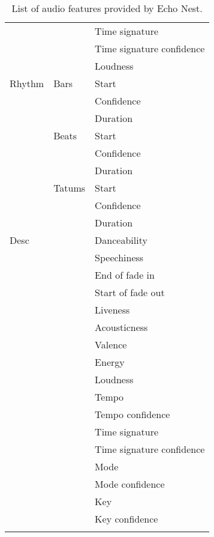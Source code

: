 \begin{center}
\begin{longtable}{ p{} p{} p{} }
& & Time signature \\ \cmidrule(r){3-3}
& & Time signature confidence \\ \cmidrule(r){3-3}
& & Loudness \\ \hline
Rhythm & Bars & Start \\ \cmidrule(r){3-3}
& & Confidence \\ \cmidrule(r){3-3}
& & Duration \\ \cmidrule(r){2-3}
& Beats & Start \\ \cmidrule(r){3-3}
& & Confidence \\ \cmidrule(r){3-3}
& & Duration \\ \cmidrule(r){2-3}
& Tatums & Start \\ \cmidrule(r){3-3}
& & Confidence \\ \cmidrule(r){3-3}
& & Duration \\ \hline
Desc & & Danceability \\ \cmidrule(r){3-3}
& & Speechiness \\ \cmidrule(r){3-3}
& & End of fade in \\ \cmidrule(r){3-3}
& & Start of fade out \\ \cmidrule(r){3-3}
& & Liveness \\ \cmidrule(r){3-3}
& & Acousticness \\ \cmidrule(r){3-3}
& & Valence \\ \cmidrule(r){3-3}
& & Energy \\ \cmidrule(r){3-3}
& & Loudness \\ \cmidrule(r){3-3}
& & Tempo \\ \cmidrule(r){3-3}
& & Tempo confidence \\ \cmidrule(r){3-3}
& & Time signature \\ \cmidrule(r){3-3}
& & Time signature confidence \\ \cmidrule(r){3-3}
& & Mode \\ \cmidrule(r){3-3}
& & Mode confidence \\ \cmidrule(r){3-3}
& & Key \\ \cmidrule(r){3-3}
& & Key confidence \\ \bottomrule



\caption[List of audio features provided by Echo Nest]{List of audio features provided by Echo Nest.}
\label{table:echonestFeatures}
\end{longtable}
\end{center}